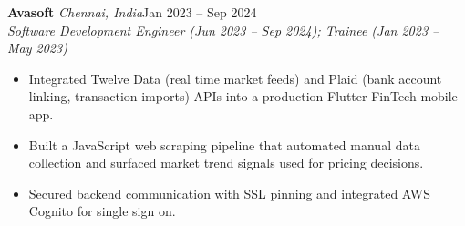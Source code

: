 \documentclass[a4paper,11pt]{article}
\newcommand{\role}[4]{\textbf{#1}{\color{muted}\,\textperiodcentered\,\textit{#2}}\hfill{\color{muted}#3}\\
  \textit{#4}\par}
\newcommand{\gap}{\vspace{5pt}}
\begin{document}
\gap
\role{Avasoft}{Chennai, India}{Jan 2023 – Sep 2024}{Software Development Engineer (Jun 2023 – Sep 2024); Trainee (Jan 2023 – May 2023)}
\begin{itemize}
  \item Integrated Twelve Data (real time market feeds) and Plaid (bank account linking, transaction imports) APIs into a production Flutter FinTech mobile app.
  \item Built a JavaScript web scraping pipeline that automated manual data collection and surfaced market trend signals used for pricing decisions.
  \item Secured backend communication with SSL pinning and integrated AWS Cognito for single sign on.
\end{itemize}

\end{document}
